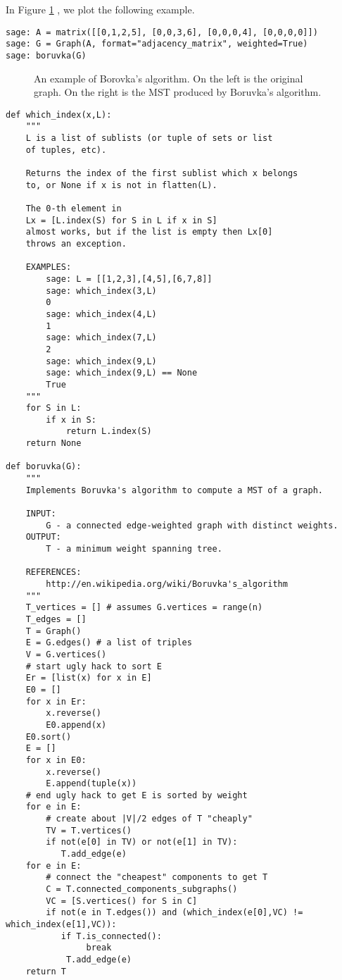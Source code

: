 \begin{example}
In Figure \ref{fig:tree-forests:Boruvkas-algorithm} , we plot the following example.
{\rm
\begin{lstlisting}
sage: A = matrix([[0,1,2,5], [0,0,3,6], [0,0,0,4], [0,0,0,0]])
sage: G = Graph(A, format="adjacency_matrix", weighted=True)
sage: boruvka(G)
\end{lstlisting}
}

\begin{figure}[!htbp]
\centering

\caption{An example of Borovka's algorithm. On the left is the
  original graph. On the right is the MST produced by Boruvka's algorithm.}
\label{fig:tree-forests:Boruvkas-algorithm}
\end{figure}

\end{example}

\begin{lstlisting}
def which_index(x,L):
    """
    L is a list of sublists (or tuple of sets or list
    of tuples, etc).

    Returns the index of the first sublist which x belongs
    to, or None if x is not in flatten(L).

    The 0-th element in
    Lx = [L.index(S) for S in L if x in S]
    almost works, but if the list is empty then Lx[0]
    throws an exception.

    EXAMPLES:
        sage: L = [[1,2,3],[4,5],[6,7,8]]
        sage: which_index(3,L)
        0
        sage: which_index(4,L)
        1
        sage: which_index(7,L)
        2
        sage: which_index(9,L)
        sage: which_index(9,L) == None
        True
    """
    for S in L:
        if x in S:
            return L.index(S)
    return None

def boruvka(G):
    """
    Implements Boruvka's algorithm to compute a MST of a graph.

    INPUT:
        G - a connected edge-weighted graph with distinct weights.
    OUTPUT:
        T - a minimum weight spanning tree.

    REFERENCES:
        http://en.wikipedia.org/wiki/Boruvka's_algorithm
    """
    T_vertices = [] # assumes G.vertices = range(n)
    T_edges = []
    T = Graph()
    E = G.edges() # a list of triples
    V = G.vertices()
    # start ugly hack to sort E
    Er = [list(x) for x in E]
    E0 = []
    for x in Er:
        x.reverse()
        E0.append(x)
    E0.sort()
    E = []
    for x in E0:
        x.reverse()
        E.append(tuple(x))
    # end ugly hack to get E is sorted by weight
    for e in E:
        # create about |V|/2 edges of T "cheaply"
        TV = T.vertices()
        if not(e[0] in TV) or not(e[1] in TV):
           T.add_edge(e)
    for e in E:
        # connect the "cheapest" components to get T
        C = T.connected_components_subgraphs()
        VC = [S.vertices() for S in C]
        if not(e in T.edges()) and (which_index(e[0],VC) != which_index(e[1],VC)):
           if T.is_connected():
                break
            T.add_edge(e)
    return T
\end{lstlisting}

